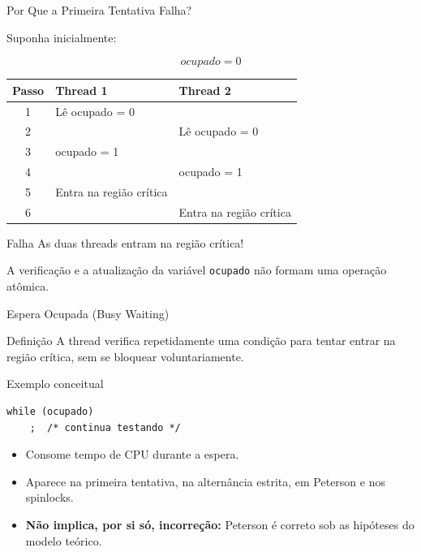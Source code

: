 \documentclass[aspectratio=169,11pt]{beamer}
\begin{document}
\begin{frame}{Por Que a Primeira Tentativa Falha?}

Suponha inicialmente:

\[
ocupado = 0
\]

\begin{center}
\small
\begin{tabular}{c|l|l}
\hline
Passo & Thread 1 & Thread 2 \\
\hline
1 & Lê ocupado = 0 & \\
2 & & Lê ocupado = 0 \\
3 & ocupado = 1 & \\
4 & & ocupado = 1 \\
5 & Entra na região crítica & \\
6 & & Entra na região crítica \\
\hline
\end{tabular}
\end{center}

\vspace{0.4cm}

\begin{alertblock}{Falha}
As duas threads entram na região crítica!

A verificação e a atualização da variável
\texttt{ocupado} não formam uma operação atômica.
\end{alertblock}

\end{frame}



\begin{frame}[fragile]{Espera Ocupada (Busy Waiting)}
\begin{block}{Definição}
A thread verifica repetidamente uma condição para tentar entrar
na região crítica, sem se bloquear voluntariamente.
\end{block}
\begin{exampleblock}{Exemplo conceitual}
\begin{verbatim}
while (ocupado)
    ;  /* continua testando */
\end{verbatim}
\end{exampleblock}
\begin{itemize}
\item Consome tempo de CPU durante a espera.
\item Aparece na primeira tentativa, na alternância estrita,
      em Peterson e nos spinlocks.
\item \textbf{Não implica, por si só, incorreção:} Peterson é correto
      sob as hipóteses do modelo teórico.
\end{itemize}
\end{frame}
\end{document}
